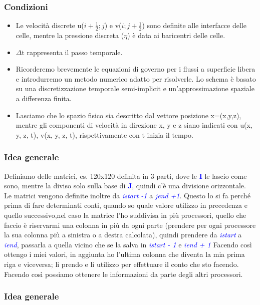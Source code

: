 \documentclass{beamer}
\begin{document}
	\begin{frame}
	\frametitle{Condizioni}
	\begin{itemize}
		\item Le velocità discrete u($i+\frac{1}{2} ; j $) e v($ i ; j+\frac{1}{2}$) sono definite alle interfacce delle celle, mentre la pressione discreta ($\eta$) è data ai baricentri delle celle.\\
		\item $\Delta$t rappresenta il passo temporale.
		\smallskip
		
		\item Ricorderemo brevemente le equazioni di governo per i flussi a superficie libera e introdurremo un metodo numerico adatto per risolverle. Lo schema è basato su una discretizzazione temporale semi-implicit e un'approssimazione spaziale a differenza finita.
		\item Lasciamo che lo spazio fisico sia descritto dal vettore posizione x=(x,y,z), mentre gli componenti di velocità in direzione x, y e z siano indicati con u(x, y, z, t), v(x, y, z, t), rispettivamente con t inizia il tempo.
	\end{itemize}
\end{frame}

\begin{frame}
	\frametitle{Idea generale}
 	Definiamo delle matrici, es. 120x120 definita in 3 parti, dove le \textcolor{blue}{\textbf{I}} le lascio come sono, mentre la diviso solo sulla base di \textcolor{blue}{\textbf{J}},
 	quindi c'è una divisione orizzontale.\\
 	Le matrici vengono definite inoltre da \textcolor{blue}{\emph{istart -1}} a \textcolor{blue}{\emph{jend +1}}. Questo lo si fa  perché prima di fare determinati conti, quando so quale valore utilizzo in precedenza e quello successivo,nel caso la matrice l'ho suddivisa in più processori, quello che faccio è riservarmi una colonna in più da ogni parte (prendere per ogni processore la sua colonna più a sinistra o a destra calcolata), quindi prendere da \textcolor{blue}{\emph{istart}} a \textcolor{blue}{\emph{iend}}, passarla a quella vicino che se la salva in \textcolor{blue}{\emph{istart - 1}} e \textcolor{blue}{\emph{iend + 1}}
 	Facendo così ottengo i miei valori, in aggiunta ho l'ultima colonna che diventa la mia prima riga e viceversa; li prendo e li utilizzo per effettuare il conto che sto facendo.\\
 	Facendo così possiamo ottenere le informazioni da parte degli altri processori. 
	
\end{frame}
\begin{frame}
	\frametitle{Idea generale}

	
	
\end{frame}
\end{document}
